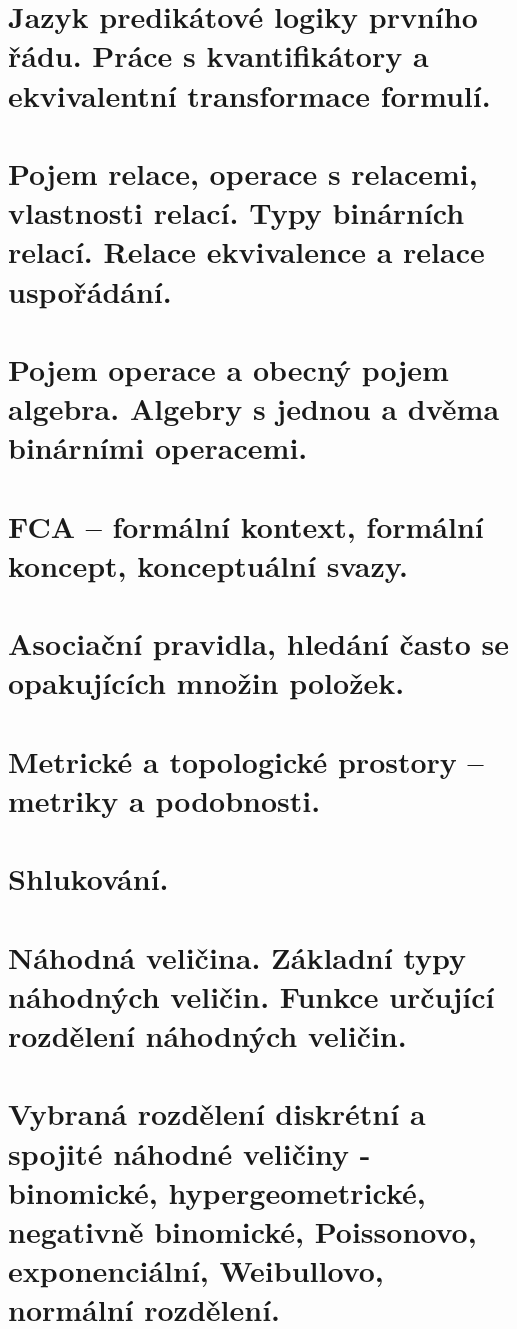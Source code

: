 \documentclass{book}
\begin{document}
\chapter{Jazyk predikátové logiky prvního řádu. Práce s kvantifikátory a ekvivalentní transformace formulí.}

\clearpage

\chapter{Pojem relace, operace s relacemi, vlastnosti relací. Typy binárních relací. Relace ekvivalence a relace uspořádání.}

\clearpage

\chapter{Pojem operace a obecný pojem algebra. Algebry s jednou a dvěma binárními operacemi.}

\clearpage

\chapter{FCA – formální kontext, formální koncept, konceptuální svazy.}

\clearpage

\chapter{Asociační pravidla, hledání často se opakujících množin položek.}

\chapter{Metrické a topologické prostory – metriky a podobnosti.}

\clearpage

\chapter{Shlukování.}

\clearpage

\chapter{Náhodná veličina. Základní typy náhodných veličin. Funkce určující rozdělení náhodných veličin.}

\clearpage

\chapter{Vybraná rozdělení diskrétní a spojité náhodné veličiny - binomické, hypergeometrické, negativně binomické, Poissonovo, exponenciální, Weibullovo, normální rozdělení.}

\clearpage
\end{document}
